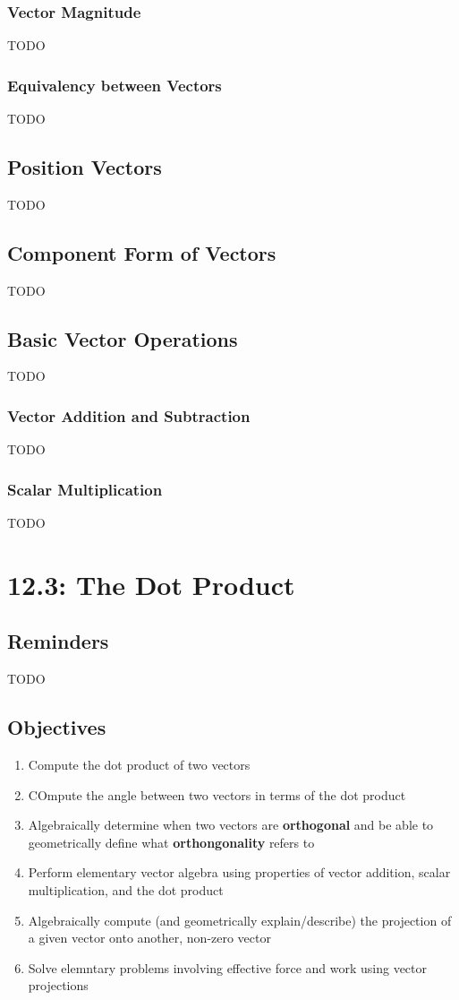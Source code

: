 \documentclass{report}
\begin{document}
\begin{sloppypar}
\subsection{Vector Magnitude}
TODO
\subsection{Equivalency between Vectors}
TODO
\section{Position Vectors}
TODO
\section{Component Form of Vectors}
TODO
\section{Basic Vector Operations}
TODO
\subsection{Vector Addition and Subtraction}
TODO
\subsection{Scalar Multiplication}
TODO



\chapter{12.3: The Dot Product}
\section{Reminders}
TODO
\section{Objectives}
\begin{enumerate}
  \item Compute the dot product of two vectors
  \item COmpute the angle between two
        vectors in terms of the dot product
  \item Algebraically determine when two vectors
        are \textbf{orthogonal} and be able to
        geometrically define what \textbf{orthongonality}
        refers to
  \item Perform elementary vector algebra using
        properties of vector addition, scalar
        multiplication, and the dot product
  \item Algebraically compute (and geometrically
        explain/describe) the projection of a given
        vector onto another, non-zero vector
  \item Solve elemntary problems involving effective
        force and work using vector projections
\end{enumerate}


\end{sloppypar}
\end{document}
